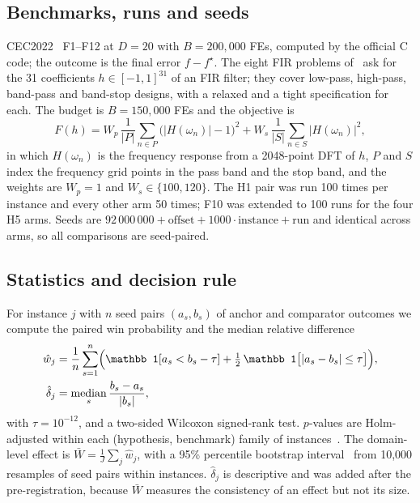 \documentclass[11pt]{article}
\theoremstyle{definition}
\theoremstyle{remark}
\begin{document}
\subsection{Benchmarks, runs and seeds}
CEC2022~\citep{kumar2021cec2022} F1--F12 at $D=20$ with $B=200{,}000$ FEs, computed by the official C code; the outcome is
the final error $f-f^\star$. The eight FIR problems of~\citet{flores2026mphbs} ask for the 31 coefficients
$h\in[-1,1]^{31}$ of an FIR filter; they cover low-pass, high-pass, band-pass and band-stop designs, with a
relaxed and a tight specification for each. The budget is $B=150{,}000$ FEs and the objective is
\begin{equation}
F(h) = W_p\,\frac{1}{|P|}\sum_{n\in P}\bigl(|H(\omega_n)|-1\bigr)^2 + W_s\,\frac{1}{|S|}\sum_{n\in S}|H(\omega_n)|^2,
\label{eq:fir}
\end{equation}
in which $H(\omega_n)$ is the frequency response from a 2048-point DFT of $h$, $P$ and $S$ index the frequency grid
points in the pass band and the stop band, and the weights are $W_p=1$ and $W_s\in\{100,120\}$. The H1 pair was run 100 times per instance and every other arm 50 times; F10 was
extended to 100 runs for the four H5 arms. Seeds are $92\,000\,000+\text{offset}+1000\cdot\text{instance}+\text{run}$ and
identical across arms, so all comparisons are seed-paired.

\subsection{Statistics and decision rule}
For instance $j$ with $n$ seed pairs $(a_s,b_s)$ of anchor and comparator outcomes we compute the paired win
probability and the median relative difference
\begin{align}
\hat w_j &= \frac{1}{n}\sum_{s=1}^{n}\Bigl(\mathbb 1[a_s<b_s-\tau] + \tfrac12\,\mathbb 1\bigl[|a_s-b_s|\le\tau\bigr]\Bigr),
\label{eq:w}\\
\hat\delta_j &= \operatorname*{median}_s \frac{b_s-a_s}{|b_s|},
\label{eq:delta}
\end{align}
with $\tau=10^{-12}$, and a two-sided Wilcoxon signed-rank test. $p$-values are Holm-adjusted within each (hypothesis,
benchmark) family of instances~\citep{holm1979,derrac2011tutorial}. The domain-level effect is
$\bar W=\frac1J\sum_j\hat w_j$, with a 95\% percentile bootstrap interval~\citep{efron1979bootstrap} from 10{,}000
resamples of seed pairs within instances. $\hat\delta_j$ is descriptive and was added after the pre-registration, because
$\bar W$ measures the consistency of an effect but not its size.
\end{document}
